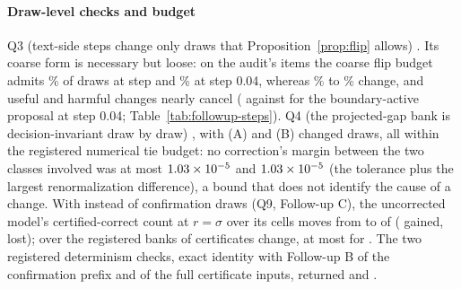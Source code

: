 \paragraph{Draw-level checks and budget}
Q3 (text-side steps change only draws that Proposition~\ref{prop:flip}
allows) \FUQThreeSummary{}. Its coarse form is necessary but loose: on the
audit's items the coarse flip budget admits \FUQThreeBudgetLo\% of draws at step
\FUQThreeStepMin{} and \FUQThreeBudgetFour\% at step 0.04, whereas
\FUQThreeChangedLo\% to \FUQThreeChangedFour\% change, and useful and harmful
changes nearly cancel (\FUQThreeUsefulFour{} against \FUQThreeHarmfulFour{} for
the boundary-active proposal at step 0.04; Table~\ref{tab:followup-steps}).
Q4 (the projected-gap bank is decision-invariant draw by draw)
\FUQFourSummary{}, with \FUQFourChangedA{} (A) and \FUQFourChangedB{} (B) changed
draws, all within the
registered numerical tie budget: no correction's margin between the two
classes involved was at most $1.03\times10^{-5}$ and $1.03\times10^{-5}$ (the
tolerance plus the largest renormalization difference), a bound that does not
identify the cause of a change. With
\FUBudgetDraws{} instead of \FUConfDraws{} confirmation draws (Q9, Follow-up C),
the uncorrected model's certified-correct count at $r=\sigma$ over its
\FUCellsC{} cells moves from \FUQNineIdFour{} to \FUQNineIdFull{} of
\FUQNineItems{} (\FUQNineIdGained{} gained, \FUQNineIdLost{} lost); over the
\FUBanksC{} registered banks \FUQNineAllChanged{} of \FUQNineAllCerts{}
certificates change, at most \FUQNineMaxChanged{} for \FUQNineMaxId. The two
registered determinism checks, exact identity with Follow-up B of the
confirmation prefix and of the full certificate inputs, returned
\emph{\FUQNinePrefixIdentity} and \emph{\FUQNineInputIdentity}.

